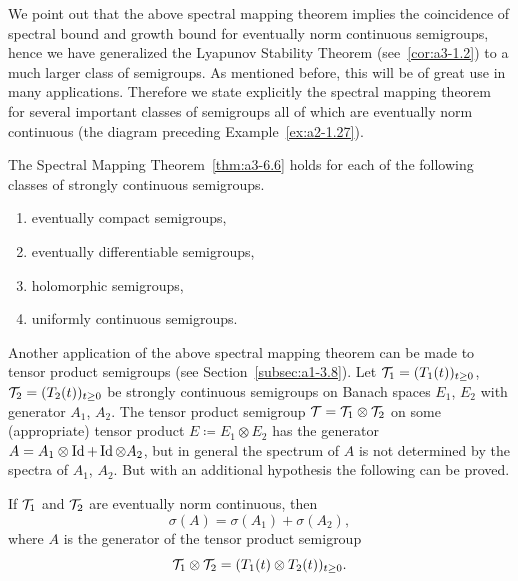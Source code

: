 We point out that the above spectral mapping theorem implies the coincidence of spectral bound and growth bound for eventually norm continuous semigroups, hence we have generalized the Lyapunov Stability Theorem (see~\ref{cor:a3-1.2}) to a much larger class of semigroups.
As mentioned before, this will be of great use in many applications.
Therefore we state explicitly the spectral mapping theorem for several important classes of semigroups all of which are eventually norm continuous (\cf the diagram preceding Example~\ref{ex:a2-1.27}).
\begin{corollary}\label{cor:a3-6.7}
The Spectral Mapping Theorem~\ref{thm:a3-6.6}
holds for each of the following classes of strongly continuous semigroups.
\begin{enumerate}[\upshape (i)]
\item 
eventually compact semigroups,

\item 
eventually differentiable semigroups,

\item 
holomorphic semigroups,

\item 
uniformly continuous semigroups.
\end{enumerate}
\end{corollary}
Another application of the above spectral mapping theorem can be made to tensor product semigroups (see Section~\ref{subsec:a1-3.8}).
Let $\TT_{1} = (T_{1}(t))_{t\geq 0}$, $\TT_{2} = (T_{2}(t))_{t\geq 0}$ be strongly continuous semigroups on Banach spaces $E_{1}$, $E_{2}$ with generator $A_{1}$, $A_{2}$.
The tensor product semigroup $\mathcal{T} = \mathcal{T}_{1} \otimes \mathcal{T}_{2}$ on some (appropriate) tensor product $E \coloneq E_{1} \otimes E_{2}$ has the generator $A = A_{1}\otimes\operatorname{Id} + \operatorname{Id}\otimes A_{2}$, but in general the spectrum of\/ $A$ is not determined by the spectra of\/ $A_{1}$, $A_{2}$.
But with an additional hypothesis the following can be proved.
%
\begin{corollary}\label{cor:a3-6.8}
If\/ $\mathcal{T}_{1}$ and $\mathcal{T}_{2}$ are eventually norm continuous, then
\[
	\sigma(A) = \sigma(A_{1}) + \sigma(A_{2}) ,
\]
where $A$ is the generator of the tensor product semigroup
\[
	\TT_{1} \otimes \TT_{2} = (T_{1}(t) \otimes T_{2}(t))_{t\geq 0} .
\]
\end{corollary}

